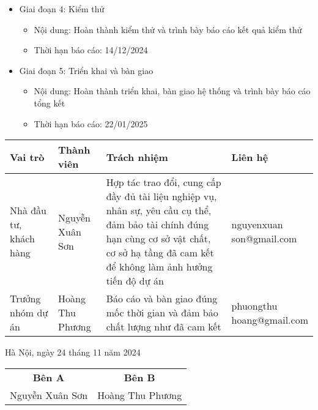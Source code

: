 {\begin{minipage}{\textwidth}
\begin{itemize}
\begin{itemize}
\begin{itemize}
                    \begin{itemize}
                        \item Nội dung: Hoàn thành phát triển phần mềm và trình bày báo cáo tiến độ xây dựng
                        \item Thời hạn báo cáo: 07/12/2024
                    \end{itemize}
                    \item Giai đoạn 4: Kiểm thử
                    \begin{itemize}
                        \item Nội dung: Hoàn thành kiểm thử và trình bày báo cáo kết quả kiểm thử
                        \item Thời hạn báo cáo: 14/12/2024
                    \end{itemize}
                    \item Giai đoạn 5: Triển khai và bàn giao
                    \begin{itemize}
                        \item Nội dung: Hoàn thành triển khai, bàn giao hệ thống và trình bày báo cáo tổng kết
                        \item Thời hạn báo cáo: 22/01/2025
                    \end{itemize}
                \end{itemize}
            \end{itemize}
        \end{itemize}
        \centering
        \renewcommand{\arraystretch}{1.5} %
        \begin{tabular}{|p{2cm}|p{3cm}|p{6cm}|p{2.8cm}|}
            \hline
            \textbf{Vai trò} & \textbf{Thành viên} & \textbf{Trách nhiệm} & \textbf{Liên hệ} \\
            \hline
            Nhà đầu tư, khách hàng & Nguyễn Xuân Sơn & Hợp tác trao đổi, cung cấp đầy đủ tài liệu nghiệp vụ, nhân sự, yêu cầu cụ thể, đảm bảo tài chính đúng hạn cùng cơ sở vật chất, cơ sở hạ tầng đã cam kết để không làm ảnh hưởng tiến độ dự án &   \parbox[t]{4cm}{nguyenxuan\\son@gmail.com} \\
            \hline
            Trưởng nhóm dự án & Hoàng Thu Phương & Báo cáo và bàn giao đúng mốc thời gian và đảm bảo chất lượng như đã cam kết & \parbox[t]{4cm}{phuongthu\\hoang@gmail.com} \\
            \hline
        \end{tabular}
        \begin{center}
        Hà Nội, ngày 24 tháng 11 năm 2024 \\[0.5cm]
        \begin{tabular}{c c}
            \textbf{Bên A} & \textbf{Bên B} \\
            Nguyễn Xuân Sơn & Hoàng Thu Phương \\
        \end{tabular}
        \end{center}
    \end{minipage}
}
